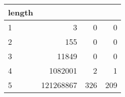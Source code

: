 \documentclass{beamer}
\renewcommand{\gets}{\leftarrow}
\newcommand{\AND}{\land}
\newcommand{\IOR}{\lor}
\newcommand{\XOR}{\oplus}
\begin{document}
%

\begin{frame}
\end{frame}


\begin{frame}
\begin{table}
\begin{tabular}{l|rrr}
length & & & \\
\hline
1 &         3 &   0 &   0 \\
2 &       155 &   0 &   0 \\
3 &     11849 &   0 &   0 \\
4 &   1082001 &   2 &   1 \\
5 & 121268867 & 326 & 209 \\
\end{tabular}
\end{table}
\end{frame}
\end{document}
